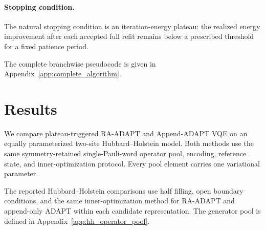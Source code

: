 \documentclass[
  reprint,
  amsmath,
  amssymb,
  aps,
  pra,
  nofootinbib,
  superscriptaddress,
  floatfix
]{revtex4-2}
\begin{document}
\paragraph*{Stopping condition.}
The natural stopping condition is an iteration-energy plateau: the realized
energy improvement after each accepted full refit remains below a prescribed
threshold for a fixed patience period.

The complete branchwise pseudocode is given in
Appendix~\ref{app:complete_algorithm}.



\section{Results}
\label{sec:results}
\label{sec:benchmarks}

We compare plateau-triggered RA-ADAPT and Append-ADAPT VQE on an equally
parameterized two-site Hubbard--Holstein model. Both methods use the same
symmetry-retained single-Pauli-word operator pool, encoding, reference state,
and inner-optimization protocol. Every pool element carries one variational
parameter.

The reported Hubbard--Holstein comparisons use half filling, open boundary conditions, and the same inner-optimization method for RA-ADAPT and append-only ADAPT within each candidate representation. The generator pool is defined in Appendix~\ref{app:hh_operator_pool}.
\end{document}
